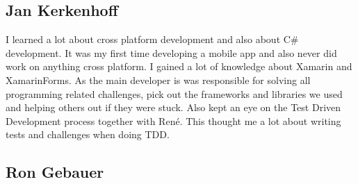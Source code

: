 \subsection{Jan Kerkenhoff}
I learned a lot about cross platform development and also about C# development. It was my first time developing a mobile app and also never did work on anything cross platform. I gained a lot of knowledge about Xamarin and \gls{XamarinForms}.
As the main developer is was responsible for solving all programming related challenges, pick out the frameworks and libraries we used and helping others out if they were stuck. Also kept an eye on the Test Driven Development process together with René. This thought me a lot about writing tests and challenges when doing TDD.


\subsection{Ron Gebauer}
